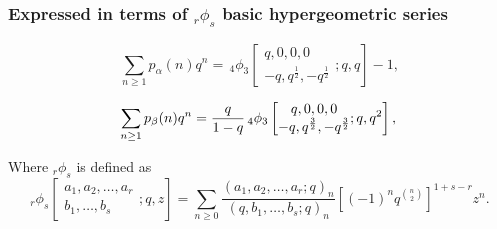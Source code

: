 \subsubsection*{Expressed in terms of $_r\phi_s$ basic hypergeometric series}

\begin{equation}
    \sum_{n\ge 1} p_{\alpha}(n)q^n =
    \,_4\phi_3
    \left[
        \begin{matrix}
            q,0,0,0\\
            -q,q^{\frac{1}{2}},-q^{\frac{1}{2}}
        \end{matrix};
    q,q
    \right]-1,
\end{equation}

\[
    \sum_{n\ge 1} p_{\beta}(n)q^n =
    \frac{q}{1-q}
    \,_4\phi_3
    \left[
        \begin{matrix}
            q,0,0,0\\
            -q,q^{\frac{3}{2}},-q^{\frac{3}{2}}
        \end{matrix};
    q,q^2
    \right],\\
\]

Where $_r\phi_s$ is defined as
\[
    _r\phi_s
    \left[
        \begin{matrix}
            a_1,a_2,\dots,a_r\\
            b_1,\dots,b_s
        \end{matrix};
    q,z
    \right]
    =
    \sum_{n\ge 0} \frac{(a_1,a_2,\dots,a_r;q)_n}{(q,b_1,\dots,b_s;q)_n}
    \left[
        (-1)^n q^{\binom{n}{2}}
    \right]^{1+s-r}
    z^n.
\]


